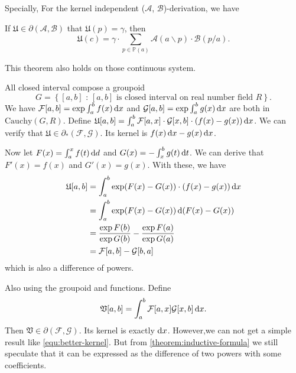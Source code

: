 Specially, For the kernel independent ($\mathcal{A}$, $\mathcal{B}$)-derivation, we have
\begin{corollary}
    If $\mathfrak{U} \in \partial(\mathcal{A}, \mathcal{B})$ that $\mathfrak{U}(p) = \gamma$, then
    \[ \mathfrak{U}(c) = \gamma \cdot\sum_{p \in \mathbb{P}(a)}\mathcal{A}(a\backslash p)\cdot\mathcal{B}(p/a). \]
\end{corollary}
This theorem also holds on those continuous system.
\begin{example}\label{exa:continous-situation-with-exact-differential}
    All closed interval compose a groupoid
    \[G = \left\{[a, b] \text{ : $[a, b]$ is closed interval on real number field $R$}\right\}.\]
    We have $\mathcal{F}[a, b] = \exp{\int_{a}^{b}f(x)\mathop{}\!\mathrm{d}x}$ and $\mathcal{G}[a, b] = \exp{\int_{a}^{b}g(x)\mathop{}\!\mathrm{d}x}$ are both in $\mathrm{Cauchy}(G, R)$. Define $\mathfrak{U}[a, b] = \int_{a}^{b}\mathcal{F}[a, x]\cdot\mathcal{G}[x,b]\cdot(f(x) - g(x))\mathop{}\!\mathrm{d} x$.
    We can verify that  $\mathfrak{U}\in \partial_{*}(\mathcal{F}, \mathcal{G})$. Its kernel is $f(x)\mathop{}\!\mathrm{d} x - g(x)\mathop{}\!\mathrm{d} x$.

    Now let $F(x) = \int_{a}^{x}f(t)\mathop{}\!\mathrm{d} d$ and $G(x) = - \int_{x}^{b}g(t)\mathop{}\!\mathrm{d} t$. We can derive that $F'(x) = f(x)$ and $G'(x) = g(x)$. With these, we have
    \begin{align}\label{equ:better-kernel}
        \mathfrak{U}[a, b] &= \int_{a}^{b}\exp(F(x)-G(x))\cdot(f(x) - g(x))\mathop{}\!\mathrm{d} x \nonumber \\
        &= \int_{a}^{b}\exp(F(x)-G(x))\mathop{}\!\mathrm{d}(F(x) - G(x)) \nonumber \\
        &= \frac{\exp F(b)}{\exp G(b)} - \frac{\exp F(a)}{\exp G(a)} \nonumber\\
        &= \mathcal{F}[a, b] - \mathcal{G}[b, a]
    \end{align}
    which is also a difference of powers.
\end{example}
\begin{example}\label{exa:continous-situation-with-kernel-independent}
    Also using the groupoid and functions. Define
    \[ \mathfrak{V}[a, b] = \int_{a}^{b}\mathcal{F}[a, x]\mathcal{G}[x,b]\mathop{}\!\mathrm{d} x. \]
    Then $\mathfrak{V} \in \partial(\mathcal{F}, \mathcal{G})$. Its kernel is exactly $\mathop{}\!\mathrm{d} x$. However,we can not get a simple result like \cref{equ:better-kernel}. But  from \cref{theorem:inductive-formula} we still speculate that it can be expressed as the difference of two powers with some coefficients.
\end{example}
